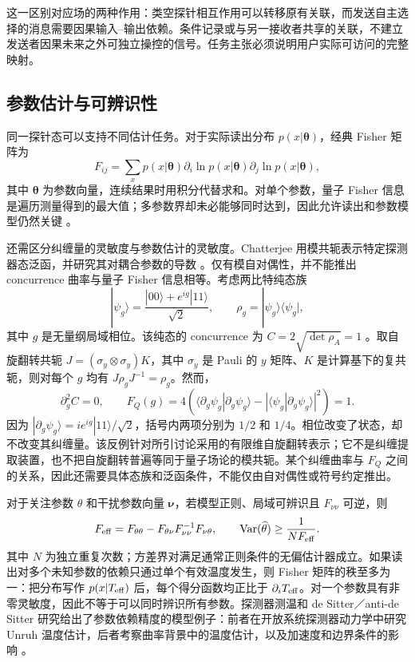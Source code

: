 \documentclass[UTF8,11pt,a4paper,fontset=none]{ctexart}
\begin{document}
这一区别对应场的两种作用：类空探针相互作用可以转移原有关联，而发送自主选择的消息需要因果输入--输出依赖。条件记录或与另一接收者共享的关联，不建立发送者因果未来之外可独立操控的信号。任务主张必须说明用户实际可访问的完整映射。

\subsection{参数估计与可辨识性}
\label{sec:metrology}
同一探针态可以支持不同估计任务。对于实际读出分布 $p(x|\boldsymbol\theta)$，经典 Fisher 矩阵为
\begin{equation}
F_{ij}=\sum_x p(x|\boldsymbol\theta)
\partial_i\ln p(x|\boldsymbol\theta)
\partial_j\ln p(x|\boldsymbol\theta),
\label{eq:classical-fi}
\end{equation}
其中 $\boldsymbol\theta$ 为参数向量，连续结果时用积分代替求和。对单个参数，量子 Fisher 信息是遍历测量得到的最大值；多参数界却未必能够同时达到，因此允许读出和参数模型仍然关键 \cite{BraunsteinCaves1994,Paris2009}。

还需区分纠缠量的灵敏度与参数估计的灵敏度。Chatterjee 用模共轭表示特定探测器态泛函，并研究其对耦合参数的导数 \cite{Chatterjee2025Modular}。仅有模自对偶性，并不能推出 concurrence 曲率与量子 Fisher 信息相等。考虑两比特纯态族
\begin{equation}
|\psi_g\rangle=\frac{|00\rangle+e^{ig}|11\rangle}{\sqrt2},
\qquad \rho_g=|\psi_g\rangle\langle\psi_g|,
\label{eq:phase-family-counterexample}
\end{equation}
其中 $g$ 是无量纲局域相位。该纯态的 concurrence 为 $C=2\sqrt{\det\rho_A}=1$ \cite{Wootters1998}。取自旋翻转共轭 $J=(\sigma_y\otimes\sigma_y)K$，其中 $\sigma_y$ 是 Pauli 的 $y$ 矩阵、$K$ 是计算基下的复共轭，则对每个 $g$ 均有 $J\rho_gJ^{-1}=\rho_g$。然而，
\begin{equation}
\partial_g^2 C=0,\qquad
F_Q(g)=4\!\left(\langle\partial_g\psi_g|\partial_g\psi_g\rangle
-|\langle\psi_g|\partial_g\psi_g\rangle|^2\right)=1.
\label{eq:curvature-qfi-counterexample}
\end{equation}
因为 $|\partial_g\psi_g\rangle=i e^{ig}|11\rangle/\sqrt2$，括号内两项分别为 $1/2$ 和 $1/4$。相位改变了状态，却不改变其纠缠量。该反例针对所引讨论采用的有限维自旋翻转表示；它不是纠缠提取装置，也不把自旋翻转普遍等同于量子场论的模共轭。某个纠缠曲率与 $F_Q$ 之间的关系，因此还需要具体态族和泛函条件，不能仅由自对偶性或符号约定推出。

对于关注参数 $\theta$ 和干扰参数向量 $\boldsymbol\nu$，若模型正则、局域可辨识且 $F_{\nu\nu}$ 可逆，则
\begin{equation}
F_{\rm eff}=F_{\theta\theta}-F_{\theta\nu}F_{\nu\nu}^{-1}F_{\nu\theta},\qquad
\operatorname{Var}(\widehat\theta)\geq\frac1{N F_{\rm eff}}.
\label{eq:effective-fi}
\end{equation}
其中 $N$ 为独立重复次数；方差界对满足通常正则条件的无偏估计器成立。如果读出对多个未知参数的依赖只通过单个有效温度发生，则 Fisher 矩阵的秩至多为一：把分布写作 $p(x|T_{\rm eff})$ 后，每个得分函数均正比于 $\partial_iT_{\rm eff}$。对一个参数具有非零灵敏度，因此不等于可以同时辨识所有参数。探测器测温和 de Sitter／anti-de Sitter 研究给出了参数依赖精度的模型例子：前者在开放系统探测器动力学中研究 Unruh 温度估计，后者考察曲率背景中的温度估计，以及加速度和边界条件的影响 \cite{TianWangFanJing2015,DuMann2021}。
\end{document}

